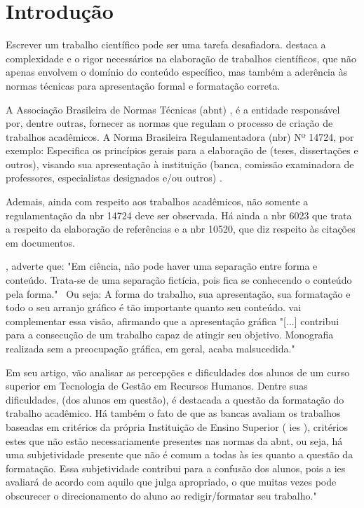 \chapter{Introdução}

Escrever um trabalho científico pode ser uma tarefa desafiadora. \cite{severino}
destaca a complexidade e o rigor necessários na elaboração de trabalhos científicos, que não
apenas envolvem o domínio do conteúdo específico, mas também a aderência às normas
técnicas para apresentação formal e formatação correta.

A Associação Brasileira de Normas Técnicas 
(\acrshort{abnt})
, é a entidade responsável por,
dentre outras, fornecer as normas que regulam o processo de criação de trabalhos acadêmicos.
A Norma Brasileira Regulamentadora 
(\acrshort{nbr})
 Nº 14724, por exemplo: Especifica os princípios
gerais para a elaboração de (teses, dissertações e outros), visando sua apresentação à
instituição (banca, comissão examinadora de professores, especialistas designados e/ou
outros)
\cite{abnt}.

Ademais, ainda com respeito aos trabalhos acadêmicos, não somente a
regulamentação da 
\acrshort{nbr}
14724 deve ser observada. Há ainda a 
\acrshort{nbr}
6023 que trata a respeito
da elaboração de referências e a 
\acrshort{nbr}
10520, que diz respeito às citações em documentos.

\cite{castro}, adverte que: "Em ciência, não pode haver uma
separação entre forma e conteúdo. Trata-se de uma separação fictícia, pois fica se conhecendo
o conteúdo pela forma."~ Ou seja: A forma do trabalho, sua apresentação, sua formatação e
todo o seu arranjo gráfico é tão importante quanto seu conteúdo. 
\cite{medeiros} vai
complementar essa visão, afirmando que a apresentação gráfica "{[}...{]} contribui para a
consecução de um trabalho capaz de atingir seu objetivo. Monografia realizada sem a
preocupação gráfica, em geral, acaba malsucedida."~

Em seu artigo, 
\cite{SilvaVitoria}
vão analisar as percepções e dificuldades dos
alunos de um curso superior em Tecnologia de Gestão em Recursos Humanos. Dentre suas
dificuldades, (dos alunos em questão), é destacada a questão da formatação do trabalho
acadêmico. Há também o fato de que as bancas avaliam os trabalhos baseadas em critérios da
própria Instituição de Ensino Superior (
\acrshort{ies}
), critérios estes que não estão necessariamente
presentes nas normas da \acrshort{abnt}, ou seja, há uma subjetividade presente que não é comum a
todas às \acrshort{ies} quanto a questão da formatação. Essa subjetividade contribui para a confusão dos
alunos, pois a \acrshort{ies} avaliará de acordo com aquilo que julga apropriado, o que muitas vezes
pode obscurecer o direcionamento do aluno ao redigir/formatar seu trabalho."~


